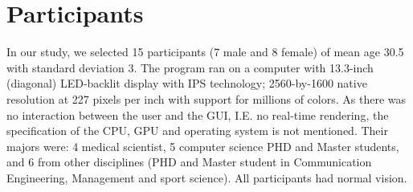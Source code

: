 \documentclass[a4paper, 12pt]{report}
\begin{document}
\section{Participants }
In our study, we selected 15 participants (7 male and 8 female) of mean age 30.5 with standard deviation 3.
The program ran on a computer with 13.3-inch (diagonal) LED-backlit display with IPS technology; 2560-by-1600 native resolution at 227 pixels per inch with support for millions of colors. As there was no interaction between the user and the GUI, I.E. no real-time rendering, the specification of the CPU, GPU and operating system is not mentioned. Their majors were: 4 medical scientist, 5 computer science PHD and Master students, and 6 from other disciplines (PHD and Master student in Communication Engineering, Management and sport science). All participants had normal vision. 



\end{document}
